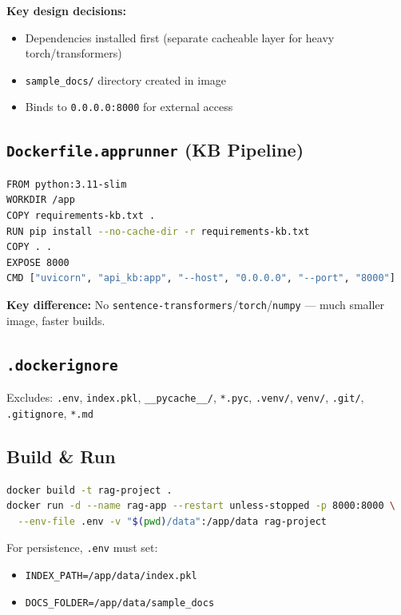 \documentclass[11pt,a4paper]{paper}
\begin{document}
\textbf{Key design decisions:}
\begin{itemize}
  \item Dependencies installed first (separate cacheable layer for heavy torch/transformers)
  \item \texttt{sample\_docs/} directory created in image
  \item Binds to \texttt{0.0.0.0:8000} for external access
\end{itemize}

\subsection{\texttt{Dockerfile.apprunner} (KB Pipeline)}

\begin{lstlisting}[language=bash, style=bashstyle, caption={Dockerfile.apprunner (KB pipeline).}, label=lst:dockerfile-apprunner]
FROM python:3.11-slim
WORKDIR /app
COPY requirements-kb.txt .
RUN pip install --no-cache-dir -r requirements-kb.txt
COPY . .
EXPOSE 8000
CMD ["uvicorn", "api_kb:app", "--host", "0.0.0.0", "--port", "8000"]
\end{lstlisting}

\textbf{Key difference:} No \texttt{sentence-transformers}/\texttt{torch}/\texttt{numpy} — much smaller image, faster builds.

\subsection{\texttt{.dockerignore}}

Excludes: \texttt{.env}, \texttt{index.pkl}, \texttt{\_\_pycache\_\_/}, \texttt{*.pyc}, \texttt{.venv/}, \texttt{venv/}, \texttt{.git/}, \texttt{.gitignore}, \texttt{*.md}

\subsection{Build \& Run}

\begin{lstlisting}[language=bash, style=bashstyle, caption={Docker build and run.}, label=lst:docker-run]
docker build -t rag-project .
docker run -d --name rag-app --restart unless-stopped -p 8000:8000 \
  --env-file .env -v "$(pwd)/data":/app/data rag-project
\end{lstlisting}

For persistence, \texttt{.env} must set:
\begin{itemize}
  \item \texttt{INDEX\_PATH=/app/data/index.pkl}
  \item \texttt{DOCS\_FOLDER=/app/data/sample\_docs}
\end{itemize}
\end{document}
